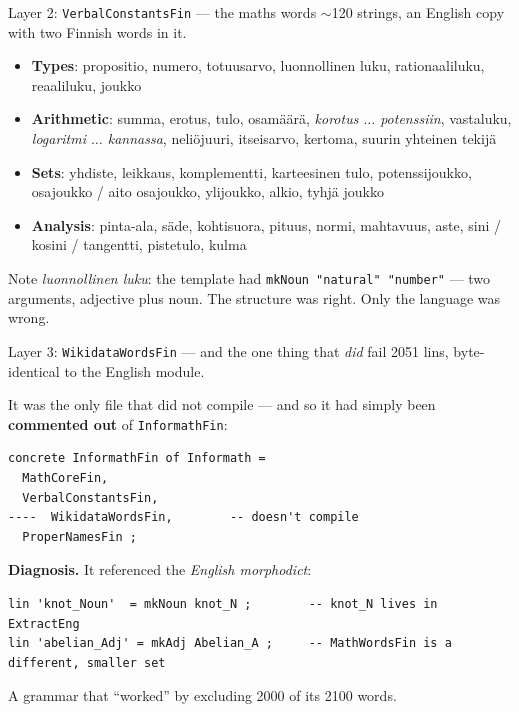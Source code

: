 \documentclass[10pt,aspectratio=169]{beamer}
\begin{document}
\begin{frame}{Layer 2: \texttt{VerbalConstantsFin} --- the maths words}
  $\sim$120 strings, an English copy with two Finnish words in it.

  \vspace{0.5em}
  \begin{itemize}\small
    \item \textbf{Types}: propositio, numero, totuusarvo, luonnollinen luku,
          rationaaliluku, reaaliluku, joukko
    \item \textbf{Arithmetic}: summa, erotus, tulo, osamäärä,
          \emph{korotus $\dots$ potenssiin}, vastaluku,
          \emph{logaritmi $\dots$ kannassa}, neliöjuuri, itseisarvo, kertoma,
          suurin yhteinen tekijä
    \item \textbf{Sets}: yhdiste, leikkaus, komplementti, karteesinen tulo,
          potenssijoukko, osajoukko / aito osajoukko, ylijoukko, alkio, tyhjä joukko
    \item \textbf{Analysis}: pinta-ala, säde, kohtisuora, pituus, normi,
          mahtavuus, aste, sini / kosini / tangentti, pistetulo, kulma
  \end{itemize}

  \vspace{0.5em}
  \small
  Note \emph{luonnollinen luku}: the template had
  \texttt{mkNoun "natural" "number"} --- two arguments, adjective plus noun.
  The structure was right. Only the language was wrong.
\end{frame}

\begin{frame}[fragile]{Layer 3: \texttt{WikidataWordsFin} --- and the one thing that \emph{did} fail}
  2051 lins, byte-identical to the English module.

  It was the only file that did not compile --- and so it had simply been
  \textbf{commented out} of \texttt{InformathFin}:

\begin{lstlisting}
concrete InformathFin of Informath =
  MathCoreFin,
  VerbalConstantsFin,
----  WikidataWordsFin,        -- doesn't compile
  ProperNamesFin ;
\end{lstlisting}

  \vspace{0.5em}
  \textbf{Diagnosis.} It referenced the \emph{English morphodict}:

\begin{lstlisting}
lin 'knot_Noun'  = mkNoun knot_N ;        -- knot_N lives in ExtractEng
lin 'abelian_Adj' = mkAdj Abelian_A ;     -- MathWordsFin is a different, smaller set
\end{lstlisting}

  \vspace{0.3em}
  A grammar that ``worked'' by excluding 2000 of its 2100 words.
\end{frame}
\end{document}
